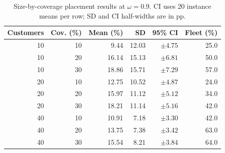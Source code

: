 \begin{table}[!t]
\centering
\footnotesize
\caption{Size-by-coverage placement results at $\omega=0.9$. CI uses 20 instance means per row; SD and CI half-widths are in pp.}
\label{tab:multiseed_by_size_coverage}
\setlength{\tabcolsep}{3pt}
\renewcommand{\arraystretch}{1.12}
\begin{tabular}{rrrrrr}
\toprule
Customers & Cov. (\%) & Mean (\%) & SD & 95\% CI & Fleet (\%) \\
\midrule
10 & 10 & 9.44 & 12.03 & $\pm 4.75$ & 25.0 \\
10 & 20 & 16.14 & 15.13 & $\pm 6.81$ & 50.0 \\
10 & 30 & 18.86 & 15.71 & $\pm 7.29$ & 57.0 \\
20 & 10 & 12.75 & 10.52 & $\pm 4.87$ & 24.0 \\
20 & 20 & 15.97 & 11.12 & $\pm 5.12$ & 34.0 \\
20 & 30 & 18.21 & 11.14 & $\pm 5.16$ & 42.0 \\
40 & 10 & 10.91 & 7.18 & $\pm 3.30$ & 42.0 \\
40 & 20 & 13.75 & 7.38 & $\pm 3.42$ & 63.0 \\
40 & 30 & 15.54 & 8.21 & $\pm 3.84$ & 64.0 \\
\bottomrule
\end{tabular}
\end{table}
